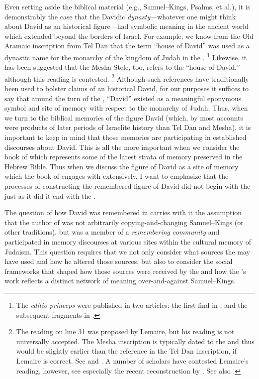 Even setting aside the biblical material (e.g., Samuel--Kings, Psalms, et al.), it is demonstrably the case that the Davidic \emph{dynasty}---whatever one might think about David as an historical figure---had symbolic meaning in the ancient world which extended beyond the borders of Israel. For example, we know from the Old Aramaic inscription from Tel Dan that the term  ``house of David'' was used as a dynastic name for the monarchy of the kingdom of Judah in the .%
    \footnote{The \emph{editio princeps} were published in two articles: the first find in \cite{biran-naveh_iej1993}, and the subsequent fragments in \cite{biran-naveh_iej1995}.}
Likewise, it has been suggested that the Mesha Stele, too, refers to the ``house of David,'' although this reading is contested.%
    \footnote{The reading  on line 31 was proposed by Lemaire, but his reading is not universally accepted. The Mesha inscription is typically dated to the  and thus would be slightly earlier than the reference in the Tel Dan inscription, if Lemaire is correct. See \cite{lemaire_sel1994} and \cite{lemaire_bar1994}. A number of scholars have contested Lemaire's reading, however, see especially the recent reconstruction by \cite{finkelstein-etal_ta2019}. See also \cite[164 n. 792]{parker2013}.}
Although such references have traditionally been used to bolster claims of an historical David, for our purposes it suffices to say that around the turn of the , ``David'' existed as a meaningful eponymous symbol and site of memory with respect to the monarchy of Judah. Thus, when we turn to the biblical memories of the figure David (which, by most accounts were products of later periods of Israelite history than Tel Dan and Mesha), it is important to keep in mind that those memories are participating in established discourses about David. This is all the more important when we consider the book of \chronicles which represents some of the latest strata of memory preserved in the Hebrew Bible. Thus when we discuss the figure of David as a site of memory which the book of \chronicles engages with extensively, I want to emphasize that the processes of constructing the remembered figure of David did not begin with the \chronicler just as it did it end with the \chronicler.\autocite{frohlich_frohlich2019}

The question of how David was remembered in \chronicles carries with it the assumption that the author of \chronicles was not arbitrarily copying-and-changing Samuel--Kings (or other traditions), but was a member of a \emph{remembering community} and participated in memory discourses at various sites within the cultural memory of \secondtemple Judaism. This question requires that we not only consider what sources the \chronicler may have used and how he altered those sources, but also to consider the social frameworks that shaped how those sources were received by the \chronicler and how the \chronicler's work reflects a distinct network of meaning over-and-against Samuel--Kings.

